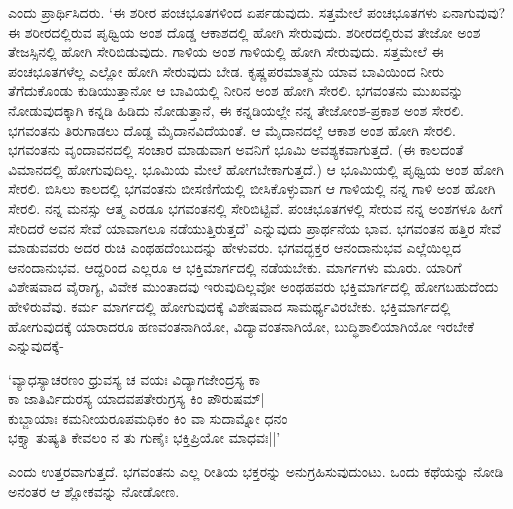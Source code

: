 ಎಂದು ಪ್ರಾರ್ಥಿಸಿದರು. `ಈ ಶರೀರ ಪಂಚಭೂತಗಳಿಂದ ಏರ್ಪಡುವುದು. ಸತ್ತಮೇಲೆ ಪಂಚಭೂತಗಳು ಏನಾಗುವುವು? ಈ ಶರೀರದಲ್ಲಿರುವ ಪೃಥ್ವಿಯ ಅಂಶ ದೊಡ್ಡ ಆಕಾಶದಲ್ಲಿ ಹೋಗಿ ಸೇರುವುದು. ಶರೀರದಲ್ಲಿರುವ ತೇಜೋ ಅಂಶ ತೇಜಸ್ಸಿನಲ್ಲಿ ಹೋಗಿ ಸೇರಿಬಿಡುವುದು. ಗಾಳಿಯ ಅಂಶ ಗಾಳಿಯಲ್ಲಿ ಹೋಗಿ ಸೇರುವುದು. ಸತ್ತಮೇಲೆ ಈ ಪಂಚಭೂತಗಳೆಲ್ಲ ಎಲ್ಲೋ ಹೋಗಿ ಸೇರುವುದು ಬೇಡ. ಕೃಷ್ಣಪರಮಾತ್ಮನು ಯಾವ ಬಾವಿಯಿಂದ ನೀರು ತೆಗೆದುಕೊಂಡು ಕುಡಿಯುತ್ತಾನೋ ಆ ಬಾವಿಯಲ್ಲಿ ನೀರಿನ ಅಂಶ ಹೋಗಿ ಸೇರಲಿ. ಭಗವಂತನು ಮುಖವನ್ನು ನೋಡುವುದಕ್ಕಾಗಿ ಕನ್ನಡಿ ಹಿಡಿದು ನೋಡುತ್ತಾನೆ, ಈ ಕನ್ನಡಿಯಲ್ಲೇ ನನ್ನ ತೇಜೋಂಶ-ಪ್ರಕಾಶ ಅಂಶ ಸೇರಲಿ. ಭಗವಂತನು ತಿರುಗಾಡಲು ದೊಡ್ಡ ಮೈದಾನವಿದೆಯಂತೆ. ಆ ಮೈದಾನದಲ್ಲೆ ಆಕಾಶ ಅಂಶ ಹೋಗಿ ಸೇರಲಿ. ಭಗವಂತನು ವೃಂದಾವನದಲ್ಲಿ ಸಂಚಾರ ಮಾಡುವಾಗ ಅವನಿಗೆ ಭೂಮಿ ಅವಶ್ಯಕವಾಗುತ್ತದೆ. (ಈ ಕಾಲದಂತೆ ವಿಮಾನದಲ್ಲಿ ಹೋಗುವುದಿಲ್ಲ. ಭೂಮಿಯ ಮೇಲೆ ಹೋಗಬೇಕಾಗುತ್ತದೆ.) ಆ ಭೂಮಿಯಲ್ಲಿ ಪೃಥ್ವಿಯ ಅಂಶ ಹೋಗಿ ಸೇರಲಿ. ಬಿಸಿಲು ಕಾಲದಲ್ಲಿ ಭಗವಂತನು ಬೀಸಣಿಗೆಯಲ್ಲಿ ಬೀಸಿಕೊಳ್ಳುವಾಗ ಆ ಗಾಳಿಯಲ್ಲಿ ನನ್ನ ಗಾಳಿ ಅಂಶ ಹೋಗಿ ಸೇರಲಿ. ನನ್ನ ಮನಸ್ಸು ಆತ್ಮ ಎರಡೂ ಭಗವಂತನಲ್ಲಿ ಸೇರಿಬಿಟ್ಟಿವೆ. ಪಂಚಭೂತಗಳಲ್ಲಿ ಸೇರುವ ನನ್ನ ಅಂಶಗಳೂ ಹೀಗೆ ಸೇರಿದರೆ ಅವನ ಸೇವೆ ಯಾವಾಗಲೂ ನಡೆಯುತ್ತಿರುತ್ತದೆ' ಎನ್ನುವುದು ಪ್ರಾರ್ಥನೆಯ ಭಾವ. ಭಗವಂತನ ಹತ್ತಿರ ಸೇವೆ ಮಾಡುವವರು ಅದರ ರುಚಿ ಎಂಥಹದೆಂಬುದನ್ನು ಹೇಳುವರು. ಭಗವದ್ಭಕ್ತರ ಆನಂದಾನುಭವ ಎಲ್ಲೆಯಿಲ್ಲದ ಆನಂದಾನುಭವ. ಆದ್ದರಿಂದ ಎಲ್ಲರೂ ಆ ಭಕ್ತಿಮಾರ್ಗದಲ್ಲಿ ನಡೆಯಬೇಕು. ಮಾರ್ಗಗಳು ಮೂರು. ಯಾರಿಗೆ ವಿಶೇಷವಾದ ವೈರಾಗ್ಯ, ವಿವೇಕ ಮುಂತಾದವು ಇರುವುದಿಲ್ಲವೋ ಅಂಥಹವರು ಭಕ್ತಿಮಾರ್ಗದಲ್ಲಿ ಹೋಗಬಹುದೆಂದು ಹೇಳಿರುವೆವು. ಕರ್ಮ ಮಾರ್ಗದಲ್ಲಿ ಹೋಗುವುದಕ್ಕೆ ವಿಶೇಷವಾದ ಸಾಮರ್ಥ್ಯವಿರಬೇಕು. ಭಕ್ತಿಮಾರ್ಗದಲ್ಲಿ ಹೋಗುವುದಕ್ಕೆ ಯಾರಾದರೂ ಹಣವಂತನಾಗಿಯೋ, ವಿದ್ಯಾವಂತನಾಗಿಯೋ, ಬುದ್ಧಿಶಾಲಿಯಾಗಿಯೋ ಇರಬೇಕೆ ಎನ್ನುವುದಕ್ಕೆ-

\begin{shloka}
`ವ್ಯಾಧಸ್ಯಾಚರಣಂ ಧ್ರುವಸ್ಯ ಚ ವಯಃ ವಿದ್ಯಾಗಜೇಂದ್ರಸ್ಯ ಕಾ\\
ಕಾ ಜಾತಿರ್ವಿದುರಸ್ಯ ಯಾದವಪತೇರುಗ್ರಸ್ಯ ಕಿಂ ಪೌರುಷಮ್|\\
ಕುಬ್ಜಾಯಾಃ ಕಮನೀಯರೂಪಮಧಿಕಂ ಕಿಂ ವಾ ಸುದಾಮ್ನೋ ಧನಂ\\
ಭಕ್ತ್ಯಾ ತುಷ್ಯತಿ ಕೇವಲಂ ನ ತು ಗುಣೈಃ ಭಕ್ತಿಪ್ರಿಯೋ ಮಾಧವಃ||'
\end{shloka}

ಎಂದು ಉತ್ತರವಾಗುತ್ತದೆ. ಭಗವಂತನು ಎಲ್ಲ ರೀತಿಯ ಭಕ್ತರನ್ನು ಅನುಗ್ರಹಿಸುವುದುಂಟು. ಒಂದು ಕಥೆಯನ್ನು ನೋಡಿ ಅನಂತರ ಆ ಶ್ಲೋಕವನ್ನು ನೋಡೋಣ.

